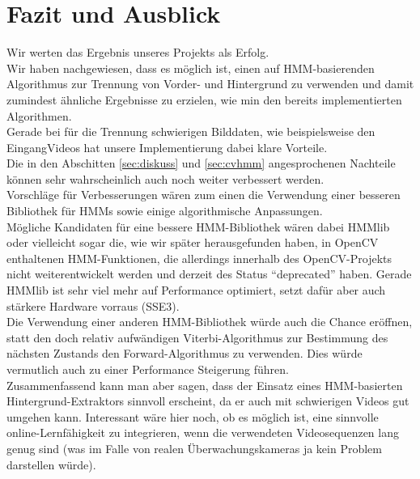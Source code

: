 \section{Fazit und Ausblick}
\label{chap:fazit}
Wir werten das Ergebnis unseres Projekts als Erfolg.\\
Wir haben nachgewiesen, dass es möglich ist, einen auf HMM-basierenden Algorithmus zur Trennung von Vorder- und Hintergrund zu verwenden und damit zumindest ähnliche Ergebnisse zu erzielen, wie min den bereits implementierten Algorithmen.\\
Gerade bei für die Trennung schwierigen Bilddaten, wie beispielsweise den \glqq Eingang\grqq Videos hat unsere Implementierung dabei klare Vorteile.\\
Die in den Abschitten \ref{sec:diskuss} und \ref{sec:cvhmm} angesprochenen Nachteile können sehr wahrscheinlich auch noch weiter verbessert werden.\\
Vorschläge für Verbesserungen wären zum einen die Verwendung einer besseren Bibliothek für HMMs sowie einige algorithmische Anpassungen.\\
Mögliche Kandidaten für eine bessere HMM-Bibliothek wären dabei HMMlib oder vielleicht sogar die, wie wir später herausgefunden haben, in OpenCV enthaltenen HMM-Funktionen, die allerdings innerhalb des OpenCV-Projekts nicht weiterentwickelt werden und derzeit des Status “deprecated” haben.
Gerade HMMlib ist sehr viel mehr auf Performance optimiert, setzt dafür aber auch stärkere Hardware vorraus (SSE3).\\
Die Verwendung einer anderen HMM-Bibliothek würde auch die Chance eröffnen, statt den doch relativ aufwändigen Viterbi-Algorithmus zur Bestimmung des nächsten Zustands den Forward-Algorithmus zu verwenden. Dies würde vermutlich auch zu einer Performance Steigerung führen.\\
Zusammenfassend kann man aber sagen, dass der Einsatz eines HMM-basierten Hintergrund-Extraktors sinnvoll erscheint, da er auch mit schwierigen Videos gut umgehen kann. Interessant wäre hier noch, ob es möglich ist, eine sinnvolle online-Lernfähigkeit zu integrieren, wenn die verwendeten Videosequenzen lang genug sind (was im Falle von realen Überwachungskameras ja kein Problem darstellen würde).
